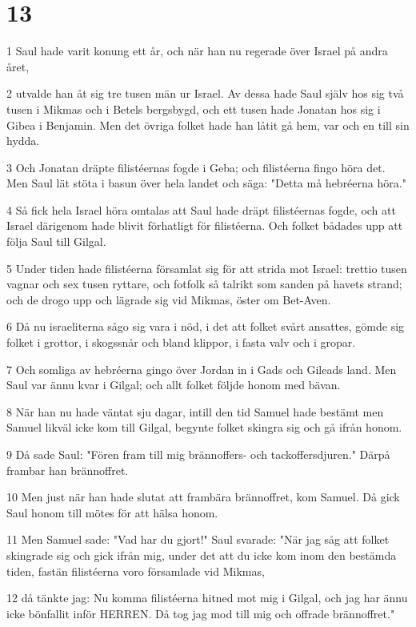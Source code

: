 \chapter{13}

\par 1 Saul hade varit konung ett år, och när han nu regerade över Israel på andra året,
\par 2 utvalde han åt sig tre tusen män ur Israel. Av dessa hade Saul själv hos sig två tusen i Mikmas och i Betels bergsbygd, och ett tusen hade Jonatan hos sig i Gibea i Benjamin. Men det övriga folket hade han låtit gå hem, var och en till sin hydda.
\par 3 Och Jonatan dräpte filistéernas fogde i Geba; och filistéerna fingo höra det. Men Saul lät stöta i basun över hela landet och säga: "Detta må hebréerna höra."
\par 4 Så fick hela Israel höra omtalas att Saul hade dräpt filistéernas fogde, och att Israel därigenom hade blivit förhatligt för filistéerna. Och folket bådades upp att följa Saul till Gilgal.
\par 5 Under tiden hade filistéerna församlat sig för att strida mot Israel: trettio tusen vagnar och sex tusen ryttare, och fotfolk så talrikt som sanden på havets strand; och de drogo upp och lägrade sig vid Mikmas, öster om Bet-Aven.
\par 6 Då nu israeliterna sågo sig vara i nöd, i det att folket svårt ansattes, gömde sig folket i grottor, i skogssnår och bland klippor, i fasta valv och i gropar.
\par 7 Och somliga av hebréerna gingo över Jordan in i Gads och Gileads land. Men Saul var ännu kvar i Gilgal; och allt folket följde honom med bävan.
\par 8 När han nu hade väntat sju dagar, intill den tid Samuel hade bestämt men Samuel likväl icke kom till Gilgal, begynte folket skingra sig och gå ifrån honom.
\par 9 Då sade Saul: "Fören fram till mig brännoffers- och tackoffersdjuren." Därpå frambar han brännoffret.
\par 10 Men just när han hade slutat att frambära brännoffret, kom Samuel. Då gick Saul honom till mötes för att hälsa honom.
\par 11 Men Samuel sade: "Vad har du gjort!" Saul svarade: "När jag såg att folket skingrade sig och gick ifrån mig, under det att du icke kom inom den bestämda tiden, fastän filistéerna voro församlade vid Mikmas,
\par 12 då tänkte jag: Nu komma filistéerna hitned mot mig i Gilgal, och jag har ännu icke bönfallit inför HERREN. Då tog jag mod till mig och offrade brännoffret."
